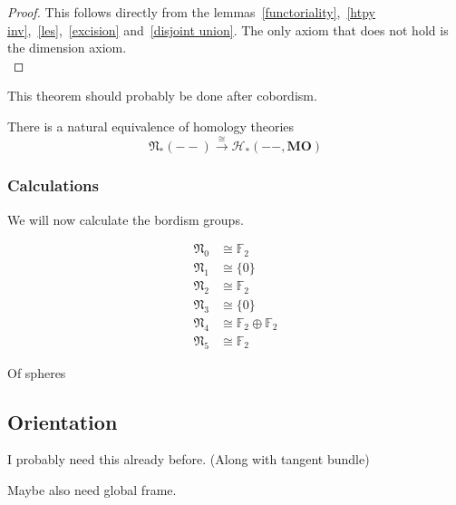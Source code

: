 \documentclass[a4paper,11pt]{article}
\begin{document}
\begin{proof}
    This follows directly from the lemmas\ \ref{functoriality},\ \ref{htpy inv},\ \ref{les},\ \ref{excision} and\ \ref{disjoint union}.
    The only axiom that does not hold is the dimension axiom.\\
\end{proof}


This theorem should probably be done after cobordism.
\begin{theorem}
    There is a natural equivalence of homology theories
    \[\mathfrak{N}_\ast(--)\xrightarrow{\cong}\mathcal{H}_\ast(--,\mathbf{MO})\]
\end{theorem}

\subsubsection{Calculations}

We will now calculate the bordism groups.

\begin{align*}
    \mathfrak N_0 &\cong \mathbb F_2\\
    \mathfrak N_1 &\cong \{0\}\\
    \mathfrak N_2 &\cong \mathbb F_2\\
    \mathfrak N_3 &\cong \{0\}\\
    \mathfrak N_4 &\cong \mathbb F_2\oplus\mathbb F_2\\
    \mathfrak N_5 &\cong \mathbb F_2
\end{align*}

Of spheres

\subsection{Orientation}

\begin{definition}
\end{definition}
I probably need this already before. (Along with tangent bundle)

\begin{definition}
\end{definition}

\begin{definition}
\end{definition}

\begin{definition}
\end{definition}
Maybe also need global frame.
\end{document}
